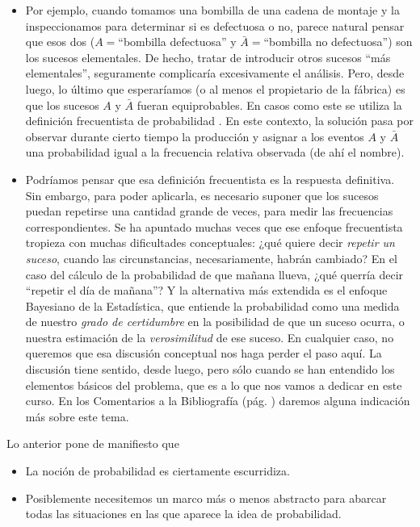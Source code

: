 \begin{itemize}
\item Por ejemplo, cuando tomamos una bombilla de una cadena de montaje y la
inspeccionamos para determinar si es defectuosa o no, parece natural pensar que esos dos ($A=$``bombilla defectuosa'' y $\bar A=$``bombilla no defectuosa'') son los sucesos elementales. De hecho, tratar de introducir otros sucesos ``más elementales'', seguramente complicaría excesivamente el análisis.  Pero, desde luego, lo \'ultimo que esperar\'iamos (o al menos el propietario de la f\'abrica) es que los sucesos $A$ y $\bar{A}$  fueran equiprobables.
En casos como este se utiliza la {\sf definici\'on frecuentista de probabilidad}
. En este contexto, la soluci\'on pasa
por observar durante cierto tiempo la producci\'on y asignar a los eventos $A$ y $\bar{A}$ una probabilidad igual a la frecuencia relativa observada (de ah\'i el nombre).

\item Podríamos pensar que esa definición frecuentista es la respuesta definitiva. Sin embargo, para poder aplicarla,  es necesario suponer que los sucesos puedan repetirse
una cantidad grande de veces, para medir las frecuencias correspondientes. Se ha apuntado muchas veces que ese enfoque frecuentista tropieza con muchas dificultades conceptuales: ¿qué quiere decir {\em repetir un suceso}, cuando las circunstancias, necesariamente, habrán cambiado? En el caso del cálculo de la probabilidad de que mañana llueva, ¿qué querría decir ``repetir el día de mañana''? Y la alternativa más extendida es el {\sf enfoque Bayesiano} de la Estadística, que entiende la probabilidad como una medida de nuestro {\em grado de certidumbre} en la posibilidad de que un suceso ocurra, o nuestra estimación de la {\em verosimilitud} de ese suceso. En cualquier caso, no queremos que esa discusión conceptual nos haga perder el paso aquí. La discusión tiene sentido, desde luego, pero sólo cuando se han entendido los elementos básicos del problema, que es a lo que nos vamos a dedicar en este curso. En los Comentarios a la Bibliografía (pág. \pageref{apendice:comentarioBibliografia}) daremos alguna indicación más sobre este tema.


\end{itemize}

Lo anterior pone de manifiesto que
\begin{itemize}
	\item La noci\'on de probabilidad es ciertamente escurridiza.
	\item Posiblemente necesitemos un marco m\'as o menos abstracto para abarcar
		todas las situaciones en las que aparece la idea de probabilidad.
\end{itemize}



